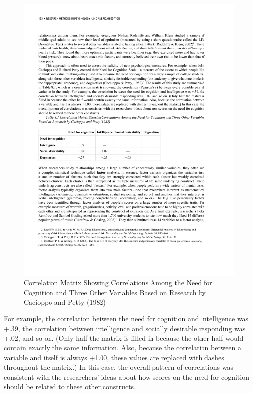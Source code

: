 \begin{figure}

\includegraphics[width=.7\linewidth]{figures/C8need.pdf}

\caption{Correlation Matrix Showing Correlations Among the Need for Cognition and Three Other Variables Based on Research by Cacioppo and Petty (1982)}

\label{fig:need}

\end{figure}

For example, the correlation between the need for cognition and intelligence was +.39, the correlation between intelligence and socially desirable responding was +.02, and so on. (Only half the matrix is filled in because the other half would contain exactly the same information. Also, because the correlation between a variable and itself is always +1.00, these values are replaced with dashes throughout the matrix.) In this case, the overall pattern of correlations was consistent with the researchers' ideas about how scores on the need for cognition should be related to these other constructs.

